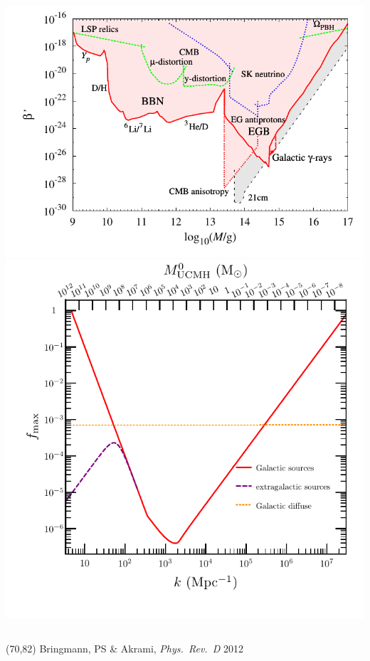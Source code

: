 \documentclass[xcolor=dvipsnames]{beamer}
\begin{document}
  \begin{columns}
    \includegraphics[width=\columnwidth]{combined}
    \includegraphics[width=\columnwidth]{Fig1}
  \end{columns}
 
  \begin{textblock}{40}(70,82)
    {\tiny Bringmann, PS \& Akrami, \emph{Phys.~Rev.~D} 2012}
  \end{textblock}
\end{document}
